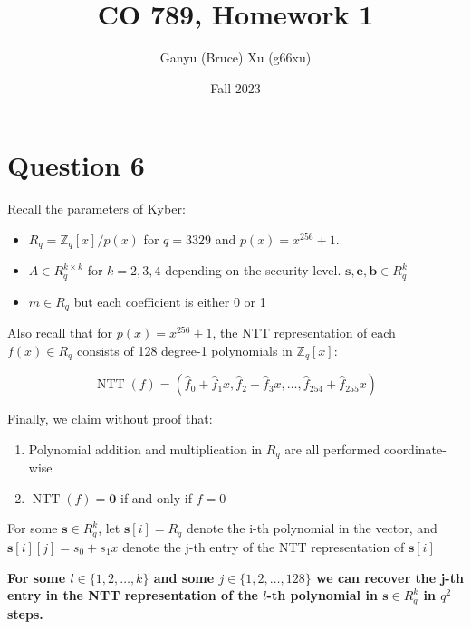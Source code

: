 \documentclass{article}
\title{CO 789, Homework 1}
\author{Ganyu (Bruce) Xu (g66xu)}
\date{Fall 2023}
\begin{document}

\section*{Question 6}
Recall the parameters of Kyber:

\begin{itemize}
    \item $R_q = \mathbb{Z}_q[x] / p(x)$ for $q = 3329$ and $p(x) = x^{256} + 1$.
    \item $A \in R_q^{k \times k}$ for $k = 2, 3, 4$ depending on the security level. $\mathbf{s}, \mathbf{e}, \mathbf{b} \in R_q^k$
    \item $m \in R_q$ but each coefficient is either 0 or 1
\end{itemize}

Also recall that for $p(x) = x^{256} + 1$, the NTT representation of each $f(x) \in R_q$ consists of 128 degree-1 polynomials in $\mathbb{Z}_q[x]$:

\begin{equation*}
    \operatorname{NTT}(f) = (
        \hat{f}_0 + \hat{f}_1x, \hat{f}_2 + \hat{f}_3x, \ldots, \hat{f}_{254} + \hat{f}_{255}x
    )
\end{equation*}

Finally, we claim without proof that:

\begin{enumerate}
    \item Polynomial addition and multiplication in $R_q$ are all performed coordinate-wise
    \item $\operatorname{NTT}(f) = \mathbf{0}$ if and only if $f = 0$
\end{enumerate}

For some $\mathbf{s} \in R_q^k$, let $\mathbf{s}[i] = R_q$ denote the i-th polynomial in the vector, and $\mathbf{s}[i][j] = s_0 + s_1x$ denote the j-th entry of the NTT representation of $\mathbf{s}[i]$

\textbf{
    For some $l \in \{1, 2, \ldots, k\}$ and some $j \in \{1, 2, \ldots, 128\}$ we can recover the j-th entry in the NTT representation of the $l$-th polynomial in $\mathbf{s} \in R_q^k$ in $q^2$ steps.
}
\end{document}
